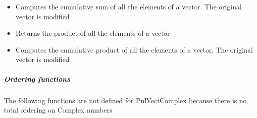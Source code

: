 \begin{itemize}
\item {}
  \sshortdescribe Computes the cumulative sum of all the elements of a
  vector. The original vector is modified

\item {}
  \sshortdescribe Returns the product of all the elements of a vector  

\item {}
  \sshortdescribe Computes the cumulative product of all the elements of a
  vector. The original vector is modified
\end{itemize}

\subparagraph{Ordering functions}
The following functions are not defined for PnlVectComplex because there is
no total ordering on Complex numbers

